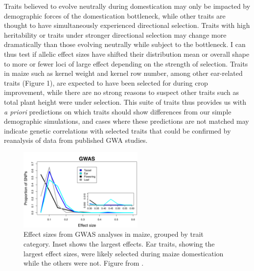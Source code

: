 Traits believed to evolve neutrally during domestication may only be impacted by demographic forces of the domestication bottleneck, while other traits are thought to have simultaneously experienced directional selection. Traits with high heritability or traits under stronger directional selection may change more dramatically than those evolving neutrally while subject to the bottleneck. I can thus test if allelic effect sizes have shifted their distribution mean or overall shape to more or fewer loci of large effect \citep{Chevin:2008} depending on the strength of selection. 
Traits in maize such as kernel weight and kernel row number, among other ear-related traits (Figure 1), are expected to have been selected for during crop improvement, while there are no strong reasons to suspect other traits such as total plant height were under selection. This suite of traits thus provides us with \emph{a priori} predictions on which traits should show differences from our simple demographic simulations, and cases where these predictions are not matched may indicate genetic correlations with selected traits that could be confirmed by reanalysis of data from published GWA studies. 

\begin{figure}
\vspace{-2ex}
\centering
   \includegraphics[width=0.55\textwidth]{Figure2_Brownetal2011.png}
  \caption{Effect sizes from GWAS analyses in maize, grouped by trait category. Inset shows the largest effects. Ear traits, showing the largest effect sizes, were likely selected during maize domestication while the others were not. Figure from \citealt{Brown:2011}.}
  \label{fig:model}
\vspace{-2ex}
\end{figure}
	
\vspace{-2ex}
